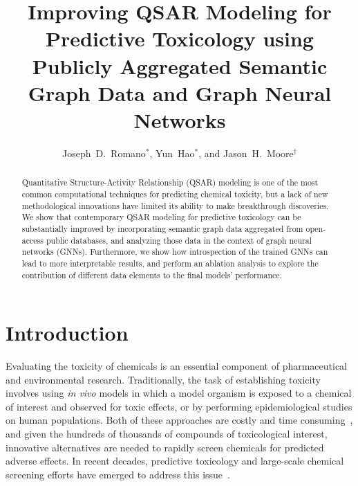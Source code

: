\documentclass{ws-procs11x85}
\begin{document}
\title{Improving QSAR Modeling for Predictive Toxicology using Publicly Aggregated Semantic Graph Data and Graph Neural Networks}

\author{Joseph~D.~Romano$^*$, Yun~Hao$^*$, and Jason~H.~Moore$^\dag$}

\address{Institute for Biomedical Informatics, University of Pennsylvania,\\
Philadelphia, Pennsylvania 19104, United States\\
$^\dag$Corresponding author e-mail: jhmoore@upenn.edu\\
$^*$These authors contributed equally.}

\begin{abstract}
Quantitative Structure-Activity Relationship (QSAR) modeling is one of the most common computational techniques for predicting chemical toxicity, but a lack of new methodological innovations have limited its ability to make breakthrough discoveries.
We show that contemporary QSAR modeling for predictive toxicology can be substantially improved by incorporating semantic graph data aggregated from open-access public databases, and analyzing those data in the context of graph neural networks (GNNs).
Furthermore, we show how introspection of the trained GNNs can lead to more interpretable results, and perform an ablation analysis to explore the contribution of different data elements to the final models' performance.
\end{abstract}


\section{Introduction}\label{introduction}
Evaluating the toxicity of chemicals is an essential component of pharmaceutical and environmental research.
Traditionally, the task of establishing toxicity involves using \textit{in vivo} models in which a model organism is exposed to a chemical of interest and observed for toxic effects, or by performing epidemiological studies on human populations.
Both of these approaches are costly and time consuming~\cite{raies2016silico}, and given the hundreds of thousands of compounds of toxicological interest, innovative alternatives are needed to rapidly screen chemicals for predicted adverse effects.
In recent decades, predictive toxicology and large-scale chemical screening efforts have emerged to address this issue~\cite{tice2013improving,roncaglioni2013silico}.
\end{document}
